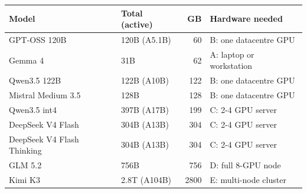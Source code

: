 \begin{tabular}{@{}llrl@{}}
\toprule
Model & Total (active) & GB & Hardware needed \\
\midrule
GPT-OSS 120B & 120B (A5.1B) & 60 & B: one datacentre GPU \\
Gemma 4 & 31B & 62 & A: laptop or workstation \\
Qwen3.5 122B & 122B (A10B) & 122 & B: one datacentre GPU \\
Mistral Medium 3.5 & 128B & 128 & B: one datacentre GPU \\
Qwen3.5 int4 & 397B (A17B) & 199 & C: 2-4 GPU server \\
DeepSeek V4 Flash & 304B (A13B) & 304 & C: 2-4 GPU server \\
DeepSeek V4 Flash Thinking & 304B (A13B) & 304 & C: 2-4 GPU server \\
GLM 5.2 & 756B & 756 & D: full 8-GPU node \\
Kimi K3 & 2.8T (A104B) & 2800 & E: multi-node cluster \\
\bottomrule
\end{tabular}
